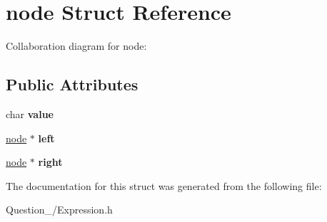 \hypertarget{structnode}{}\section{node Struct Reference}
\label{structnode}


Collaboration diagram for node\+:
\subsection*{Public Attributes}
\begin{DoxyCompactItemize}
\item 
\mbox{\label{structnode_a7c1ebf096ab7c66c6eb0029fa68c49b3}} 
char {\bfseries value}
\item 
\mbox{\label{structnode_a7cbff55ff448f557223f79299056e9b1}} 
\hyperlink{structnode}{node} $\ast$ {\bfseries left}
\item 
\mbox{\label{structnode_afafc72df7ea24f355ad3abb32a331689}} 
\hyperlink{structnode}{node} $\ast$ {\bfseries right}
\end{DoxyCompactItemize}


The documentation for this struct was generated from the following file\+:\begin{DoxyCompactItemize}
\item 
Question\+\_/Expression.\+h\end{DoxyCompactItemize}
